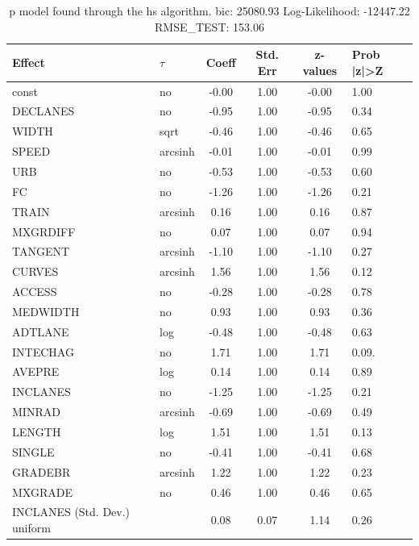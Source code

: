 \begin{table}
	\caption{p model found through the hs algorithm. bic: 25080.93 Log-Likelihood: -12447.22 RMSE_TEST: 153.06}
	\begin{center}
		\begin{tabular}{|l|l|c|c|c|l|}
			\hline
			Effect & $\tau$ & Coeff & Std. Err & z-values & Prob |z|>Z \\
			\hline
			const & no & -0.00 & 1.00 & -0.00 & 1.00 \\
			\hline
			DECLANES & no & -0.95 & 1.00 & -0.95 & 0.34 \\
			\hline
			WIDTH & sqrt & -0.46 & 1.00 & -0.46 & 0.65 \\
			\hline
			SPEED & arcsinh & -0.01 & 1.00 & -0.01 & 0.99 \\
			\hline
			URB & no & -0.53 & 1.00 & -0.53 & 0.60 \\
			\hline
			FC & no & -1.26 & 1.00 & -1.26 & 0.21 \\
			\hline
			TRAIN & arcsinh & 0.16 & 1.00 & 0.16 & 0.87 \\
			\hline
			MXGRDIFF & no & 0.07 & 1.00 & 0.07 & 0.94 \\
			\hline
			TANGENT & arcsinh & -1.10 & 1.00 & -1.10 & 0.27 \\
			\hline
			CURVES & arcsinh & 1.56 & 1.00 & 1.56 & 0.12 \\
			\hline
			ACCESS & no & -0.28 & 1.00 & -0.28 & 0.78 \\
			\hline
			MEDWIDTH & no & 0.93 & 1.00 & 0.93 & 0.36 \\
			\hline
			ADTLANE & log & -0.48 & 1.00 & -0.48 & 0.63 \\
			\hline
			INTECHAG & no & 1.71 & 1.00 & 1.71 & 0.09. \\
			\hline
			AVEPRE & log & 0.14 & 1.00 & 0.14 & 0.89 \\
			\hline
			INCLANES & no & -1.25 & 1.00 & -1.25 & 0.21 \\
			\hline
			MINRAD & arcsinh & -0.69 & 1.00 & -0.69 & 0.49 \\
			\hline
			LENGTH & log & 1.51 & 1.00 & 1.51 & 0.13 \\
			\hline
			SINGLE & no & -0.41 & 1.00 & -0.41 & 0.68 \\
			\hline
			GRADEBR & arcsinh & 1.22 & 1.00 & 1.22 & 0.23 \\
			\hline
			MXGRADE & no & 0.46 & 1.00 & 0.46 & 0.65 \\
			\hline
			INCLANES (Std. Dev.) uniform &  & 0.08 & 0.07 & 1.14 & 0.26 \\

\end{tabular}
\end{center}
\end{table}
